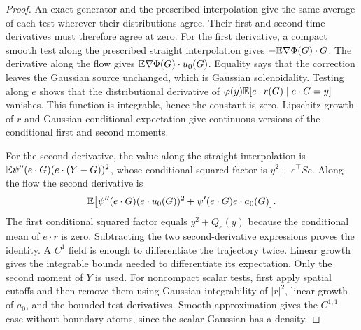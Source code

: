 \begin{proof}
An exact generator and the prescribed interpolation give the same average
of each test wherever their distributions agree. Their first and second
time derivatives must therefore agree at zero. For the first derivative, a compact smooth test
along the prescribed straight interpolation gives
$-\mathbb E\nabla\Phi(G)\cdot G$. The derivative along the flow gives
$\mathbb E\nabla\Phi(G)\cdot u_0(G)$.
Equality says that the correction leaves the Gaussian source unchanged,
which is Gaussian solenoidality. Testing along $e$ shows
that the distributional derivative of
$\varphi(y)\mathbb E[e\cdot r(G)\mid e\cdot G=y]$ vanishes.
This function is integrable, hence the constant is zero.
Lipschitz growth of $r$ and Gaussian conditional expectation give continuous
versions of the conditional first and second moments.

For the second derivative, the value along the straight interpolation is
$\mathbb E\psi''(e\cdot G)(e\cdot(Y-G))^2$, whose conditional squared factor is
$y^2+e^\top Se$. Along the flow the second derivative is
\[
 \mathbb E\big[\psi''(e\cdot G)(e\cdot u_0(G))^2
       +\psi'(e\cdot G)e\cdot a_0(G)\big].
\]
The first conditional squared factor equals $y^2+Q_e(y)$ because the
conditional mean of $e\cdot r$ is zero. Subtracting the two second-derivative
expressions proves the identity. A $C^1$ field is enough to differentiate
the trajectory twice. Linear growth gives the integrable bounds needed to
differentiate its expectation. Only the second moment of $Y$ is used.
For noncompact scalar tests, first apply spatial cutoffs and then remove
them using Gaussian integrability of $|r|^2$, linear growth of $a_0$, and
the bounded test derivatives. Smooth approximation gives the $C^{1,1}$
case without boundary atoms, since the scalar Gaussian has a density.
\end{proof}

